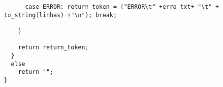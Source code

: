 \begin{lstlisting}
      case ERROR: return_token = ("ERROR\t" +erro_txt+ "\t" + to_string(linhas) +"\n"); break;

    }

    return return_token;
  }
  else
    return "";
}
\end{lstlisting}
\clearpage